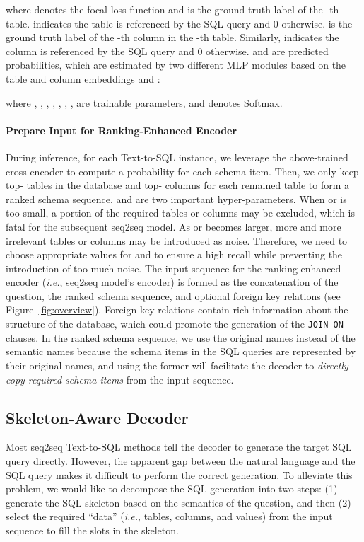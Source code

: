 \documentclass[letterpaper]{article} \usepackage{aaai23}  \usepackage{times}  \usepackage{helvet}  \usepackage{courier}  \usepackage[hyphens]{url}  \usepackage{graphicx} \urlstyle{rm} \def\UrlFont{\rm}  \usepackage{natbib}  \usepackage{caption} \frenchspacing  \setlength{\pdfpagewidth}{8.5in}  \setlength{\pdfpageheight}{11in}  \usepackage{algorithm}
\newcommand{\beqn}[1]{}
\begin{document}
\noindent where  denotes the focal loss function and  is the ground truth label of the -th table.  indicates the table is referenced by the SQL query and 0 otherwise.  is the ground truth label of the -th column in the -th table. Similarly,  indicates the column is referenced by the SQL query and 0 otherwise.  and  are predicted probabilities, which are estimated by two different MLP modules based on the table and column embeddings  and :
\beqn{
    \hat{y}_i &=& \sigma((\hat{\boldsymbol{T}}_{i}\boldsymbol{U}^t_{1}+\boldsymbol{b}^t_{1})\boldsymbol{U}^t_{2}+\boldsymbol{b}^t_{2}), \\ \nonumber
    \hat{y}_k^i &=& \sigma((\boldsymbol{C}_{k}^{i}\boldsymbol{U}^c_{1}+\boldsymbol{b}^c_{1})\boldsymbol{U}^c_{2}+\boldsymbol{b}^c_{2}),
}

\noindent where , , , , , , ,  are trainable parameters, and  denotes Softmax.

\paragraph{Prepare Input for Ranking-Enhanced Encoder}
During inference, for each Text-to-SQL instance, we leverage the above-trained cross-encoder to compute a probability for each schema item. Then, we only keep top- tables in the database and top- columns for each remained table to form a ranked schema sequence.  and  are two important hyper-parameters. When  or  is too small, a portion of the required tables or columns may be excluded, which is fatal for the subsequent seq2seq model. As  or  becomes larger, more and more irrelevant tables or columns may be introduced as noise. Therefore, we need to choose appropriate values for  and  to ensure a high recall while preventing the introduction of too much noise. The input sequence for the ranking-enhanced encoder (\emph{i.e.}, seq2seq model's encoder) is formed as the concatenation of the question, the ranked schema sequence, and optional foreign key relations (see Figure~\ref{fig:overview}). Foreign key relations contain rich information about the structure of the database, which could promote the generation of the \texttt{JOIN ON} clauses. In the ranked schema sequence, we use the original names instead of the semantic names because the schema items in the SQL queries are represented by their original names, and using the former will facilitate the decoder to \textit{directly copy required schema items} from the input sequence.

\subsection{Skeleton-Aware Decoder}
Most seq2seq Text-to-SQL methods tell the decoder to generate the target SQL query directly. However, the apparent gap between the natural language and the SQL query makes it difficult to perform the correct generation. To alleviate this problem, we would like to decompose the SQL generation into two steps: (1) generate the SQL skeleton based on the semantics of the question, and then (2) select the required ``data'' (\emph{i.e.}, tables, columns, and values) from the input sequence to fill the slots in the skeleton. 
\end{document}
